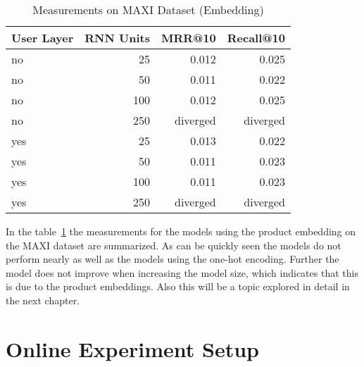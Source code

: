 \begin{table}[t]
    \centering
    \begin{tabular}{lrrr}\toprule
        \textbf{User Layer} & \textbf{RNN Units} & \textbf{MRR@10} & \textbf{Recall@10} \\ \midrule
        no & 25 & 0.012 & 0.025 \\ 
        no & 50 & 0.011 & 0.022 \\ 
        no & 100 & 0.012 & 0.025 \\ 
        no & 250 & diverged & diverged \\ \midrule
        yes & 25 & 0.013 & 0.022 \\ 
        yes & 50 & 0.011 & 0.023 \\ 
        yes & 100 & 0.011 & 0.023 \\ 
        yes & 250 & diverged & diverged \\ \bottomrule
    \end{tabular}
    \caption{Measurements on MAXI Dataset (Embedding)}
    \label{tab:maxi_dataset_measurements_embedding}
\end{table}
In the table~\ref{tab:maxi_dataset_measurements_embedding} the measurements for the models using the product embedding on the MAXI dataset are summarized.
As can be quickly seen the models do not perform nearly as well as the models using the one-hot encoding.
Further the model does not improve when increasing the model size, which indicates that this is due to the product embeddings.
Also this will be a topic explored in detail in the next chapter.
\section{Online Experiment Setup}

